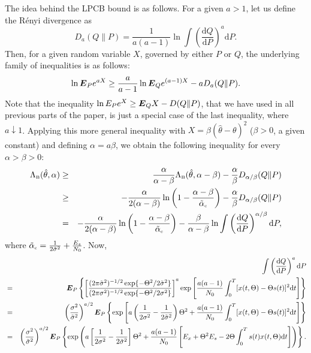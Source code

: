 \documentclass[11pt,epsf]{article}
\newcommand{\tsig}{\tilde{\sigma}}
\newcommand{\ct}{\hat{\theta}}
\newcommand {\bE} {\mbox{\boldmath $E$}}
\begin{document}
The idea behind the LPCB bound is as follows. For a given $a > 1$, let
us define the R\'enyi divergence as
\begin{equation}
D_a(Q\|P)=\frac{1}{a(a-1)}\ln\int\left(\frac{\mbox{d}Q}{\mbox{d}P}\right)^a\mbox{d}P.
\end{equation}
Then, for a given random variable $X$, governed by either $P$ or $Q$,
the underlying family of inequalities \cite{ACD15} is as follows:
\begin{equation}
\ln \bE_P e^{aX} \ge \frac{a}{a-1}\ln\bE_Q e^{(a-1)X}-aD_a(Q\|P).
\end{equation}
Note that the inequality $\ln E_P e^X \ge \bE_Q X-D(Q\|P)$, that we have used
in all previous parts of the paper, is just a special case of the last
inequality, where $a\downarrow 1$.
Applying this more general 
inequality with $X=\beta(\ct-\theta)^2$ ($\beta > 0$, a given
constant) and defining $\alpha=a\beta$, we obtain the
following inequality for every $\alpha > \beta > 0$:
\begin{eqnarray}
\Lambda_{\mbox{\tiny B}}(\ct,\alpha)&\ge&
\frac{\alpha}{\alpha-\beta}\Lambda_{\mbox{\tiny B}}(\ct,\alpha-\beta)
-\frac{\alpha}{\beta}D_{\alpha/\beta}(Q\|P)\\
&\ge&-\frac{\alpha}{2(\alpha-\beta)}\ln\left(1-\frac{\alpha-\beta}
{\tilde{\alpha}_{\mbox{\tiny c}}}\right)-
\frac{\alpha}{\beta}D_{\alpha/\beta}(Q\|P)\\
&=&-\frac{\alpha}{2(\alpha-\beta)}\ln\left(1-\frac{\alpha-\beta}
{\tilde{\alpha}_{\mbox{\tiny c}}}\right)-
\frac{\beta}{\alpha-\beta}\ln\int
\left(\frac{\mbox{d}Q}{\mbox{d}P}\right)^{\alpha/\beta}\mbox{d}P,
\end{eqnarray}
where $\tilde{\alpha}_{\mbox{\tiny c}}=\frac{1}{2\tsig^2}+\frac{E_s}{N_0}$.
Now,
\begin{eqnarray}
& &\int\left(\frac{\mbox{d}Q}{\mbox{d}P}\right)^a\mbox{d}P\nonumber\\
&=&\bE_P\left\{\left[\frac{(2\pi\tsig^2)^{-1/2}\exp\{-\Theta^2/2\tsig^2\}}
{(2\pi\sigma^2)^{-1/2}\exp\{-\Theta^2/2\sigma^2\}}\right]^a
\exp\left[\frac{a(a-1)}{N_0}\int_0^T[x(t,\Theta)-\Theta
s(t)]^2\mbox{d}t\right]\right\}\nonumber\\
&=&\left(\frac{\sigma^2}{\tsig^2}\right)^{a/2}
\bE_P\left\{\exp\left[a\left(\frac{1}{2\sigma^2}-\frac{1}{2\tsig^2}\right)\Theta^2
+\frac{a(a-1)}{N_0}\int_0^T[x(t,\Theta)-\Theta
s(t)]^2\mbox{d}t\right]\right\}\nonumber\\
&=&\left(\frac{\sigma^2}{\tsig^2}\right)^{a/2}
\bE_P\left\{\exp\left(a\left[\frac{1}{2\sigma^2}-\frac{1}{2\tsig^2}\right]\Theta^2
+\frac{a(a-1)}{N_0}\left[E_x+\Theta^2E_s-2\Theta\int_0^Ts(t)x(t,\Theta)
\mbox{d}t\right]\right)\right\}.\nonumber
\end{eqnarray}
\end{document}
